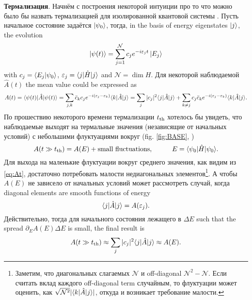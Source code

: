 
\textbf{Термализация}. Начнём с построения некоторой интуиции про то что можно было бы назвать термализацией для изолированной квантовой системы \cite{khlebnikov_thermalization_2014}. Пусть начальное состояние задаётся $\left| \psi_0 \right\rangle$, тогда, in the basis of energy eigenstates $\left| j \right\rangle$, the evolution 
\begin{equation*}
	\left| \psi(t) \right\rangle = \sum_{j=1}^{\mathcal{N}} c_j e^{- i \varepsilon_j t} \left| E_j \right\rangle
\end{equation*}
with $c_j = \bk{E_j}{\psi_0}$, $\varepsilon_j = \bk{j}[\hat{H}]{j}$ and $\mathcal{N} = \dim H$. Для некоторой наблюдаемой $\hat{A}(t)$ the mean value could be expressed as 
\begin{equation}
	A(t) = \bk{\psi(t)}[\hat{A}]{\psi(t)} = \sum_{j,k} \bar{c}_k c_j e^{-i (\varepsilon_j - \varepsilon_k)} \bk{k}[\hat{A}]{j}
	=
	\sum_j |c_j|^2 \bk{j}[\hat{A}]{j} + \sum_{k \neq j} c_j \bar{c}_k e^{-i (\varepsilon_j - \varepsilon_k)} \bk{k}[\hat{A}]{j}.
	\label{eq:At}
\end{equation}
По прошествию некоторого времени термализации $t_{\textnormal{th}}$ хотелось бы увидеть, что наблюдаемые выходят на термальные значения (независящие от начальных условий) с небольшими флуктуациями вокруг (fig. \ref{fig:BASE}, )
\begin{equation*}
	A(t \gg \tth) = A(E) + \text{small fluctuations},
	\hspace{10 mm} 
	E = \bk{\psi_0}[\hat{H}]{\psi_0}.
\end{equation*}
Для выхода на маленькие флуктуации вокруг среднего значения, как видим из \eqref{eq:At}, достаточно потребовать малости недиагональных элементов\footnote{
	Заметим, что диагональных слагаемых $\mathcal{N}$ и off-diagonal $\mathcal{N}^2- \mathcal{N}$. Если считать вклад каждого off-diagonal term случайным, то флуктуации может оценить, как $\sqrt{\mathcal{N}^2} |\bk{k}[\hat{A}]{j}|$, откуда и возникает требование малости.
}. 
А чтобы $A(E)$ не зависело от начальных условий может рассмотреть случай, когда diagonal elements are smooth functions of energy
\begin{equation*}
	\bk{j}[\hat{A}]{j} = A(\varepsilon_j).
\end{equation*}
Действительно, тогда для начального состояния лежащего в $\Delta E $ such that the spread $\partial_E A(E) \Delta E$ is small, the final result is 
\begin{equation*}
	A(t \gg \tth) \approx \sum_j |c_j|^2 \bk{j}[\hat{A}]{j} \approx  A(E).
\end{equation*}

